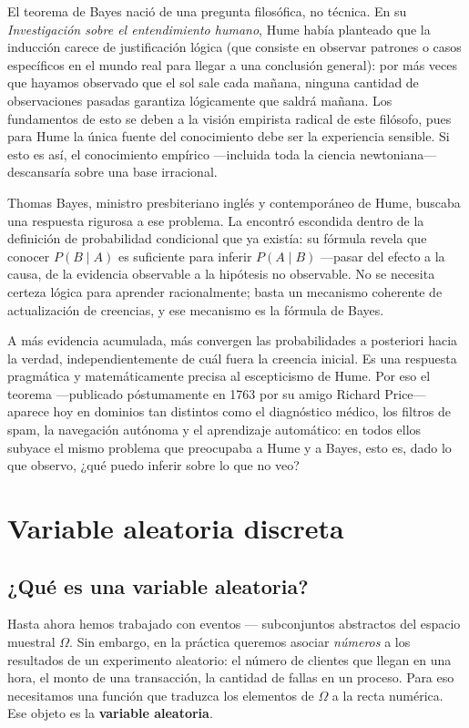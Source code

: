 \documentclass[12pt, a4paper]{book}
\numberwithin{equation}{chapter}
\begin{document}
El teorema de Bayes nació de una pregunta filosófica, no técnica. En su 
\textit{Investigación sobre el entendimiento humano}, Hume había 
planteado que la inducción carece de justificación lógica (que consiste en observar patrones o casos específicos en el mundo real para llegar a una conclusión general): por más 
veces que hayamos observado que el sol sale cada mañana, ninguna 
cantidad de observaciones pasadas garantiza lógicamente que saldrá 
mañana. Los fundamentos de esto se deben a la visión empirista radical de este filósofo, pues para Hume la única fuente del conocimiento debe ser la experiencia sensible. Si esto es así, el conocimiento empírico —incluida toda la 
ciencia newtoniana— descansaría sobre una base irracional.

Thomas Bayes, ministro presbiteriano inglés y contemporáneo de Hume, 
buscaba una respuesta rigurosa a ese problema. La encontró escondida 
dentro de la definición de probabilidad condicional que ya existía: su 
fórmula revela que conocer $P(B \mid A)$ es suficiente para inferir 
$P(A \mid B)$ —pasar del efecto a la causa, de la evidencia observable 
a la hipótesis no observable. No se necesita certeza lógica para 
aprender racionalmente; basta un mecanismo coherente de actualización 
de creencias, y ese mecanismo es la fórmula de Bayes.

A más evidencia acumulada, más convergen las probabilidades a 
posteriori hacia la verdad, independientemente de cuál fuera la 
creencia inicial. Es una respuesta pragmática y matemáticamente precisa 
al escepticismo de Hume. Por eso el teorema —publicado póstumamente en 
1763 por su amigo Richard Price— aparece hoy en dominios tan distintos 
como el diagnóstico médico, los filtros de spam, la navegación autónoma 
y el aprendizaje automático: en todos ellos subyace el mismo problema 
que preocupaba a Hume y a Bayes, esto es, dado lo que observo, ¿qué 
puedo inferir sobre lo que no veo?

\chapter{Variable aleatoria discreta}

\section{¿Qué es una variable aleatoria?}

Hasta ahora hemos trabajado con eventos — subconjuntos abstractos del 
espacio muestral $\Omega$. Sin embargo, en la práctica queremos asociar 
\textit{números} a los resultados de un experimento aleatorio: el número 
de clientes que llegan en una hora, el monto de una transacción, la 
cantidad de fallas en un proceso. Para eso necesitamos una función que 
traduzca los elementos de $\Omega$ a la recta numérica. Ese objeto es 
la \textbf{variable aleatoria}.
\end{document}
